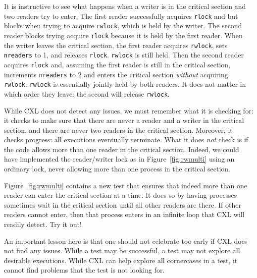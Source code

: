 \documentclass{report}
\begin{document}
It is instructive to see what happens when a writer is in the critical
section and two readers try to enter.  The first reader successfully
acquires \texttt{rlock} and but blocks when trying to acquire
\texttt{rwlock}, which is held by the writer.  The second reader blocks
trying acquire \texttt{rlock} because it is held by the first reader.
When the writer leaves the critical section, the first reader acquires
\texttt{rwlock}, sets \texttt{nreaders} to 1, and releases \texttt{rlock}.
\texttt{rwlock} is still held.
Then the second reader acquires \texttt{rlock} and, assuming the first
reader is still in the critical section, increments \texttt{nreaders} to 2
and enters the critical section \emph{without} acquiring \texttt{rwlock}.
\texttt{rwlock} is essentially jointly held by both readers.
It does not matter in which order they leave: the second will release
\texttt{rwlock}.

While CXL does not detect any issues, we must remember what it is checking
for: it checks to make sure that there are never a reader and a writer
in the critical section, and there are never two readers in the critical
section.  Moreover, it checks progress: all executions eventually terminate.
What it does \emph{not} check is if the code allows more than one reader
in the critical section.  Indeed, we could have implemented the reader/writer
lock as in Figure~\ref{fig:rwmulti} using an ordinary lock, never allowing
more than one process in the critical section.

Figure~\ref{fig:rwmulti} contains a new test that ensures that indeed more
than one reader can enter the critical section at a time.  It does so by
having processes sometimes wait in the critical section until all other readers
are there.  If other readers cannot enter, then that process enters in an
infinite loop that CXL will readily detect.  Try it out!

An important lesson here is that one should not celebrate too early if CXL
does not find any issues.  While a test may be successful, a test may not
explore all desirable executions.  While CXL can help explore all cornercases
in a test, it cannot find problems that the test is not looking for.
\end{document}
